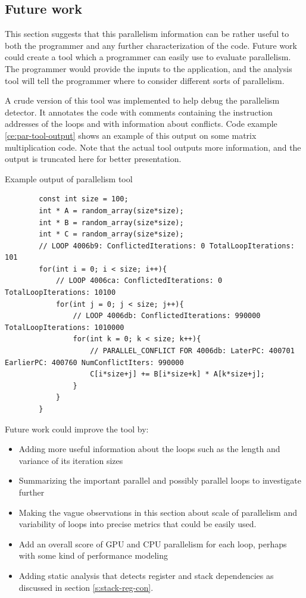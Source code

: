 \documentclass[12pt,twoside]{reedthesis}
\newenvironment{codeexample}[1][htb]
{\floatname{algorithm}{Code Example}%
	\begin{algorithm}[#1]%
	}{\end{algorithm}}
\begin{document}
		
	\subsection{Future work}
		\label{s:par-fut-work}
		
		This section suggests that this parallelism information can be rather useful to both the programmer and any further characterization of the code. Future work could create a tool which a programmer can easily use to evaluate parallelism. The programmer would provide the inputs to the application, and the analysis tool will tell the programmer where to consider different sorts of parallelism.
		
		A crude version of this tool was implemented to help debug the parallelism detector. It annotates the code with comments containing the instruction addresses of the loops and with information about conflicts. Code example \ref{ce:par-tool-output} shows an example of this output on some matrix multiplication code. Note that the actual tool outputs more information, and the output is truncated here for better presentation. 
		
		\begin{codeexample}
			\caption{Example output of parallelism tool}
			\label{ce:par-tool-output}
		\begin{verbatim}
		const int size = 100;
		int * A = random_array(size*size);
		int * B = random_array(size*size);
		int * C = random_array(size*size);
		// LOOP 4006b9: ConflictedIterations: 0 TotalLoopIterations: 101
		for(int i = 0; i < size; i++){
		    // LOOP 4006ca: ConflictedIterations: 0 TotalLoopIterations: 10100 
		    for(int j = 0; j < size; j++){
		        // LOOP 4006db: ConflictedIterations: 990000 TotalLoopIterations: 1010000
		        for(int k = 0; k < size; k++){
		            // PARALLEL_CONFLICT FOR 4006db: LaterPC: 400701 EarlierPC: 400760 NumConflictIters: 990000
		            C[i*size+j] += B[i*size+k] * A[k*size+j];
		        }
		    }
		}
		\end{verbatim}
		\end{codeexample}
		
		Future work could improve the tool by:
		
		\begin{itemize}
			\item Adding more useful information about the loops such as the length and variance of its iteration sizes
			\item Summarizing the important parallel and possibly parallel loops to investigate further
			\item Making the vague observations in this section about scale of parallelism and variability of loops into precise metrics that could be easily used. 
			\item  Add an overall score of GPU and CPU parallelism for each loop, perhaps with some kind of performance modeling
			\item  Adding static analysis that detects register and stack dependencies as discussed in  section \ref{s:stack-reg-con}.
		\end{itemize} 
	
\end{document}
